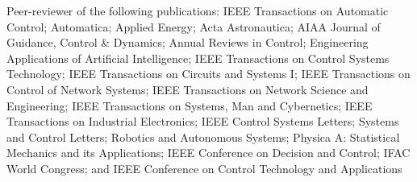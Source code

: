  Peer-reviewer of the following publications: 
                  IEEE Transactions on Automatic Control;
                  Automatica;
                  Applied Energy;
                  Acta Astronautica;
                  AIAA Journal of Guidance, Control \& Dynamics;
                  Annual Reviews in Control;
                  Engineering Applications of Artificial Intelligence;
                  IEEE Transactions on Control Systems Technology;
                  IEEE Transactions on Circuits and Systems I;
                  IEEE Transactions on Control of Network Systems;
                  IEEE Transactions on Network Science and Engineering;
                  IEEE Transactions on Systems, Man and Cybernetics;
                  IEEE Transactions on Industrial Electronics;
                  IEEE Control Systems Letters;
                  Systems and Control Letters;
                  Robotics and Autonomous Systems;
                  Physica A: Statistical Mechanics and its Applications;
                  IEEE Conference on Decision and Control;
                  IFAC World Congress; and
                  IEEE Conference on Control Technology and Applications

